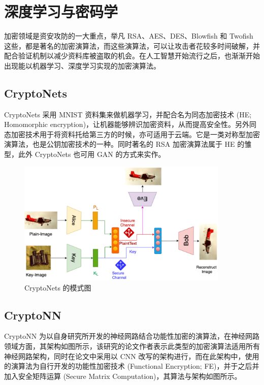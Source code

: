 \section{深度学习与密码学}

加密领域是资安攻防的一大重点，举凡 RSA、AES、DES、Blowfish 和 Twofish 这些，都是著名的加密演算法，而这些演算法，可以让攻击者花较多时间破解，并配合验证机制以减少资料库被盗取的机会。在人工智慧开始流行之后，也渐渐开始出现能以机器学习、深度学习实现的加密演算法。

\subsection{CryptoNets}

CryptoNets 采用 MNIST 资料集来做机器学习，并配合名为同态加密技术 (HE; Homomorphic encryption)，让机器能够辨识加密资料，从而提高安全性。另外同态加密技术用于将资料托给第三方的时候，亦可适用于云端。它是一类对称型加密演算法，也是公钥加密技术的一种。同时著名的 RSA 加密演算法属于 HE 的雏型，此外 CryptoNets 也可用 GAN 的方式来实作。

\begin{figure}[htb]
\centering 
\includegraphics[width=0.90\textwidth]{img/ch3m4.png} 
\caption{CryptoNets 的模式图}
\label{Test}
\end{figure}

\subsection{CryptoNN}

CryptoNN 为以自身研究所开发的神经网路结合功能性加密的演算法，在神经网路领域方面，其架构如图所示，该研究的论文作者表示此类型的加密演算法适用所有神经网路架构，同时在论文中采用以 CNN 改写的架构进行，而在此架构中，使用的演算法为自行开发的功能性加密技术 (Functional Encryption; FE)，并于之后并加入安全矩阵运算 (Secure Matrix Computation)，其算法与架构如图所示。

